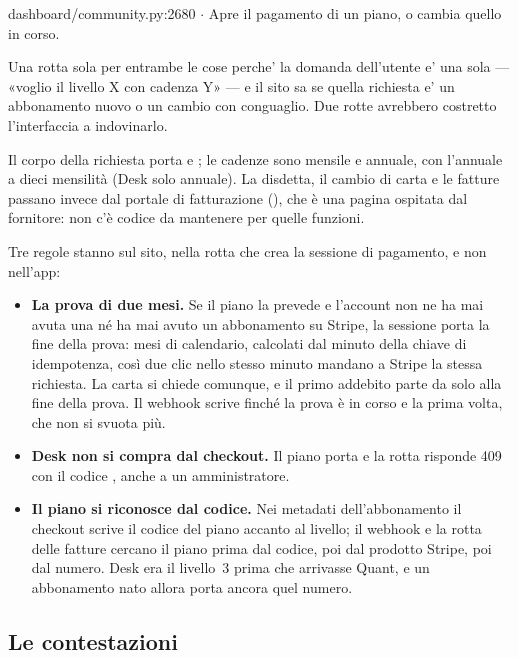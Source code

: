 \begin{commento}{dashboard/community.py:2680 $\cdot$ }
Apre il pagamento di un piano, o cambia quello in corso.

Una rotta sola per entrambe le cose perche' la domanda dell'utente e'
una sola — «voglio il livello X con cadenza Y» — e il sito sa se
quella richiesta e' un abbonamento nuovo o un cambio con conguaglio.
Due rotte avrebbero costretto l'interfaccia a indovinarlo.
\end{commento}

\noindent
Il corpo della richiesta porta  e ; le cadenze sono
mensile e annuale, con l'annuale a dieci mensilità (Desk solo annuale). La
disdetta, il cambio di carta e le fatture passano invece dal portale di
fatturazione (), che è una pagina
ospitata dal fornitore: non c'è codice da mantenere per quelle funzioni.

Tre regole stanno sul sito, nella rotta che crea la sessione di pagamento,
e non nell'app:

\begin{itemize}
  \item \textbf{La prova di due mesi.} Se il piano la prevede e l'account non
        ne ha mai avuta una né ha mai avuto un abbonamento su Stripe, la
        sessione porta la fine della prova: mesi di calendario, calcolati
        dal minuto della chiave di idempotenza, così due clic nello stesso
        minuto mandano a Stripe la stessa richiesta. La carta si chiede
        comunque, e il primo addebito parte da solo alla fine della prova. Il
        webhook scrive  finché la prova è in corso
        e  la prima volta, che non si svuota più.
  \item \textbf{Desk non si compra dal checkout.} Il piano porta
         e la rotta risponde \num{409} con il codice
        , anche a un amministratore.
  \item \textbf{Il piano si riconosce dal codice.} Nei metadati
        dell'abbonamento il checkout scrive il codice del piano accanto al
        livello; il webhook e la rotta delle fatture cercano il piano prima
        dal codice, poi dal prodotto Stripe, poi dal numero. Desk era il
        livello~\num{3} prima che arrivasse Quant, e un abbonamento nato
        allora porta ancora quel numero.
\end{itemize}

\subsection{Le contestazioni}

